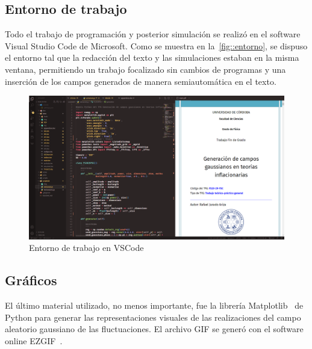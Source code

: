 \subsection{Entorno de trabajo}
Todo el trabajo de programación y posterior simulación se realizó en el software Visual Studio Code de Microsoft. Como se muestra en la~\autoref{fig::entorno}, se dispuso el entorno tal que la redacción del texto y las simulaciones estaban en la misma ventana, permitiendo un trabajo focalizado sin cambios de programas y una inserción de los campos generados de manera semiautomática en el texto.
\begin{figure}[t]
    \centering
    \includegraphics[width=\textwidth]{img/entorno.png}
    \caption{Entorno de trabajo en VSCode}
    \label{fig::entorno}
\end{figure}
\subsection{Gráficos}
El último material utilizado, no menos importante, fue la librería Matplotlib~\cite{Hunter2007} de Python para generar las representaciones visuales de las realizaciones del campo aleatorio gaussiano de las fluctuaciones. El archivo GIF se generó con el software online EZGIF~\cite{ltd2012}.